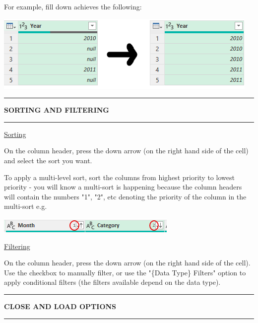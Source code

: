 \documentclass[8pt]{extarticle}
\newcommand{\heading}[1]{%
    \noindent
    \rule{\linewidth}{0.4pt}
    \begin{center}
        \vspace{-1ex}
        \textbf{#1}        
        \vspace{-2.5ex}
    \end{center}
    \rule{\linewidth}{0.4pt}
}
\begin{document}
\begin{multicols}{3}
For example, fill down achieves the following:
\begin{center}
    \includegraphics[width=0.9\columnwidth]{images/filldown.png}
\end{center}

\columnbreak
\heading{SORTING AND FILTERING}

\begin{center}
    \underline{Sorting}
\end{center}

On the column header, press the down arrow (on the right hand side of the cell) and select the sort you want. 

To apply a multi-level sort, sort the columns from highest priority to lowest priority - you will know a multi-sort is happening because the column headers will contain the numbers "1", "2", etc denoting the priority of the column in the multi-sort e.g. 
\begin{center}
    \includegraphics[width=\columnwidth]{images/multi-level-sort.png}
\end{center}

\begin{center}
    \underline{Filtering}
\end{center}

On the column header, press the down arrow (on the right hand side of the cell). Use the checkbox to manually filter, or use the "\{Data Type\} Filters" option to apply conditional filters (the filters available depend on the data type).

\heading{CLOSE AND LOAD OPTIONS}


\end{multicols}
\end{document}
